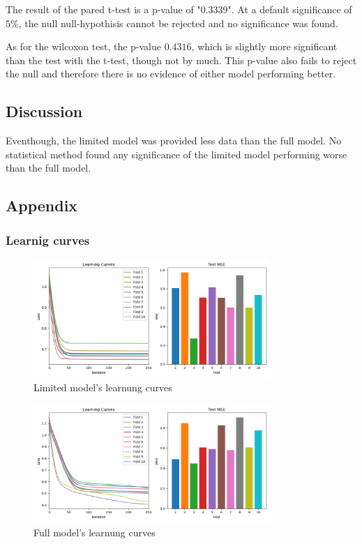 \documentclass[12pt]{article}
\begin{document}
The result of the pared t-test is a p-value of "0.3339".
At a default significance of $5\%$, the null null-hypothisis cannot be rejected and no significance was found.

As for the wilcoxon test, the p-value $0.4316$, which is slightly more significant than the test with the t-test, though not by much.
This p-value also fails to reject the null and therefore there is no evidence of either model performing better.

\subsection{Discussion}
Eventhough, the limited model was provided less data than the full model.
No statistical method found any significance of the limited model performing worse than the full model.











\newpage
\subsection{Appendix}
\subsubsection{Learnig curves}
\begin{figure}[h!]
  \includegraphics[width=0.8\textwidth]{./task_2/limited.png}
  \caption{Limited model's learnung curves}\label{fig:limited-curves}
\end{figure}
\begin{figure}[h!]
  \includegraphics[width=0.8\textwidth]{./task_2/full_features.png}
  \caption{Full model's learnung curves}\label{fig:full-curves}
\end{figure}
\end{document}
